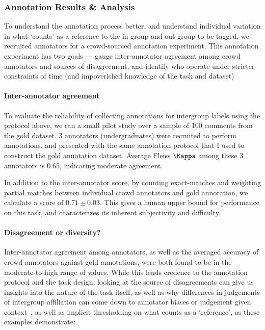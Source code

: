 

\subsubsection{Annotation Results \& Analysis}
\label{subsubsec:annotation-analysis}

To understand the annotation process better, and understand individual variation in what `counts' as a reference to the in-group and out-group to be tagged, we recruited annotators for a crowd-sourced annotation experiment. This annotation experiment has two goals --- gauge inter-annotator agreement among crowd annotators and sources of disagreement, and identify  who operate under stricter constraints of time (and impoverished knowledge of the task and dataset) 

\paragraph{Inter-annotator agreement} To evaluate the reliability of collecting annotations for intergroup labels using the protocol above, we ran a small pilot study over a sample of 100 comments from the gold dataset. 3 annotators (undergraduates) were recruited to perform annotations, and presented with the same annotation protocol that I used to construct the gold annotation dataset. Average Fleiss $\Kappa$ among these 3 annotators is  0.65, indicating moderate agreement.

In addition to the inter-annotator score, by counting exact-matches and weighting partial matches between individual crowd annotators and gold annotation, we calculate a score of $0.71 \pm 0.03$. This gives a human upper bound for performance on this task, and characterizes its inherent subjectivity and difficulty.

\paragraph{Disagreement or diversity?} Inter-annotator agreement among annotators, as well as the averaged accuracy of crowd-annotators against gold annotations, were both found to be in the moderate-to-high range of values. While this lends credence to the annotation protocol and the task design, looking at the source of disagreements can give us insights into the nature of the task itself, as well as why differences in judgements of intergroup affiliation can come down to annotator biases or judgement given context~\citep{atwell-etal-2022-role}, as well as implicit thresholding on what counts as a `reference', as these examples demonstrate:

